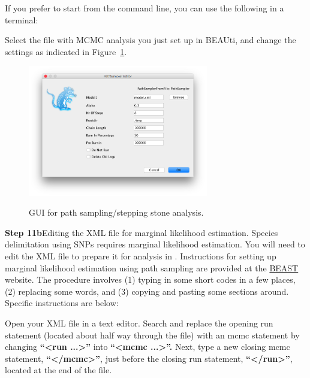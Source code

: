 {If you prefer to start from the command line, you can use the following in a terminal:


Select the file with MCMC analysis you just set up in BEAUti, and change the settings as indicated in Figure~\ref{fig:pathsampler}.

    \begin{figure}[htbp]
        \centering
        {\includegraphics[width=0.7\textwidth]{../../BFD*/screenshots/pathsampler}}
        \caption{GUI for path sampling/stepping stone analysis.}
        \label{fig:pathsampler}
    \end{figure}



{\bf Step 11b}{Editing the XML file for marginal likelihood estimation.}
Species delimitation using SNPs requires marginal likelihood estimation. 
You will need to edit the XML file to prepare it for analysis in . Instructions for setting up
marginal likelihood estimation using path sampling are provided at the \href{http://www.beast2.org/tutorials}{BEAST} website. The procedure involves (1) typing in some short codes in a few places, (2) replacing some words, and (3) copying and pasting some sections around. Specific instructions are below:
 
Open your XML file in a text editor. Search and replace the opening run statement (located about half way through the file) with an mcmc statement by changing {\bf ``<run ...>''} into {\bf ``<mcmc ...>''.} Next, type a new closing mcmc statement, {\bf ``</mcmc>''}, just before the closing run statement, {\bf ``</run>''}, located at the end of the file.

}

